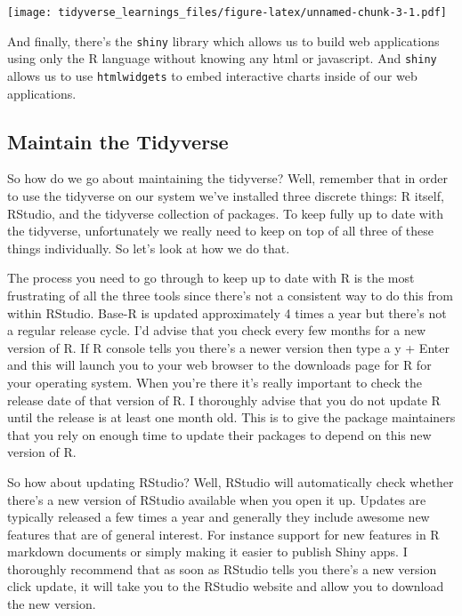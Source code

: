 \documentclass[
]{article}
\begin{document}
\texttt{[image: tidyverse\_learnings\_files/figure-latex/unnamed-chunk-3-1.pdf]}

And finally, there's the \texttt{shiny} library which allows us to build web applications using only the R language without knowing any html or javascript. And \texttt{shiny} allows us to use \texttt{htmlwidgets} to embed interactive charts inside of our web applications.

\hypertarget{maintain-the-tidyverse}{%
\subsection{Maintain the Tidyverse}\label{maintain-the-tidyverse}}

So how do we go about maintaining the tidyverse? Well, remember that in order to use the tidyverse on our system we've installed three discrete things: R itself, RStudio, and the tidyverse collection of packages. To keep fully up to date with the tidyverse, unfortunately we really need to keep on top of all three of these things individually. So let's look at how we do that.

The process you need to go through to keep up to date with R is the most frustrating of all the three tools since there's not a consistent way to do this from within RStudio. Base-R is updated approximately 4 times a year but there's not a regular release cycle. I'd advise that you check every few months for a new version of R. If R console tells you there's a newer version then type a y + Enter and this will launch you to your web browser to the downloads page for R for your operating system. When you're there it's really important to check the release date of that version of R. I thoroughly advise that you do not update R until the release is at least one month old. This is to give the package maintainers that you rely on enough time to update their packages to depend on this new version of R.

So how about updating RStudio? Well, RStudio will automatically check whether there's a new version of RStudio available when you open it up. Updates are typically released a few times a year and generally they include awesome new features that are of general interest. For instance support for new features in R markdown documents or simply making it easier to publish Shiny apps. I thoroughly recommend that as soon as RStudio tells you there's a new version click update, it will take you to the RStudio website and allow you to download the new version.
\end{document}
